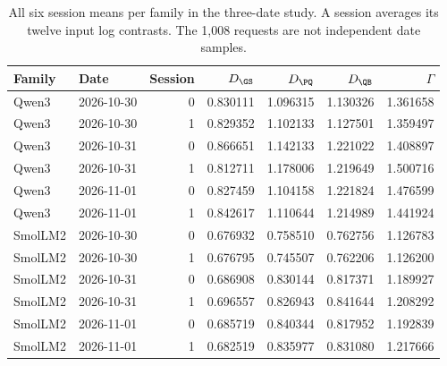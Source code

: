 \begin{table}[t]\centering\small
\caption{All six session means per family in the three-date study. A session averages its twelve input log contrasts. The 1,008 requests are not independent date samples.}\label{tab:scopesessions}
\begin{tabular}{@{}llrrrrr@{}}\toprule
Family & Date & Session & $D_{\GS}$ & $D_{\PQ}$ & $D_{\QB}$ & $\Gamma$\\\midrule
Qwen3 & 2026-10-30 & 0 & 0.830111 & 1.096315 & 1.130326 & 1.361658\\
Qwen3 & 2026-10-30 & 1 & 0.829352 & 1.102133 & 1.127501 & 1.359497\\
Qwen3 & 2026-10-31 & 0 & 0.866651 & 1.142133 & 1.221022 & 1.408897\\
Qwen3 & 2026-10-31 & 1 & 0.812711 & 1.178006 & 1.219649 & 1.500716\\
Qwen3 & 2026-11-01 & 0 & 0.827459 & 1.104158 & 1.221824 & 1.476599\\
Qwen3 & 2026-11-01 & 1 & 0.842617 & 1.110644 & 1.214989 & 1.441924\\
SmolLM2 & 2026-10-30 & 0 & 0.676932 & 0.758510 & 0.762756 & 1.126783\\
SmolLM2 & 2026-10-30 & 1 & 0.676795 & 0.745507 & 0.762206 & 1.126200\\
SmolLM2 & 2026-10-31 & 0 & 0.686908 & 0.830144 & 0.817371 & 1.189927\\
SmolLM2 & 2026-10-31 & 1 & 0.696557 & 0.826943 & 0.841644 & 1.208292\\
SmolLM2 & 2026-11-01 & 0 & 0.685719 & 0.840344 & 0.817952 & 1.192839\\
SmolLM2 & 2026-11-01 & 1 & 0.682519 & 0.835977 & 0.831080 & 1.217666\\
\bottomrule\end{tabular}
\end{table}
